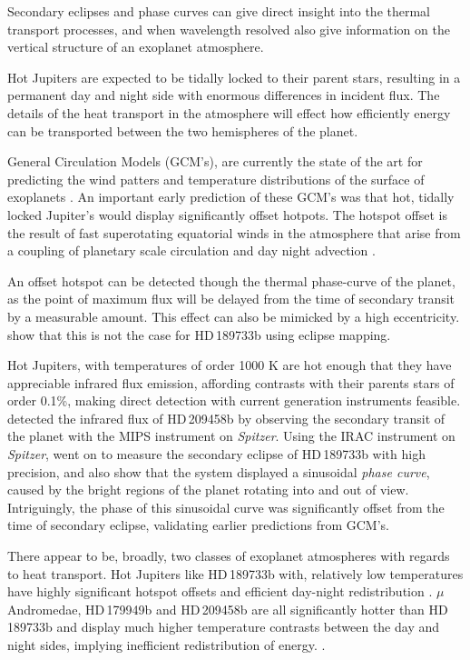 \documentclass[a4paper,fleqn,usenatbib]{mnras}
\begin{document}
Secondary eclipses and phase curves can give direct insight into the thermal transport processes, and when wavelength resolved also give information on the vertical structure of an exoplanet atmosphere.

Hot Jupiters are expected to be tidally locked to their parent stars, resulting in a permanent day and night side with enormous differences in incident flux. The details of the heat transport in the atmosphere will effect how efficiently energy can be transported between the two hemispheres of the planet.

General Circulation Models (GCM's), are currently the state of the art for predicting the wind patters and temperature distributions of the surface of exoplanets \citep[e.g.][]{Showman2008}. An important early prediction of these GCM's was that hot, tidally locked Jupiter's would display significantly offset hotpots. The hotspot offset is the result of fast superotating equatorial winds in the atmosphere that arise from a coupling of planetary scale circulation and day night advection \citep{Showman2011}.

An offset hotspot can be detected though the thermal phase-curve of the planet, as the point of maximum flux will be delayed from the time of secondary transit by a measurable amount. This effect can also be mimicked by a high eccentricity. \citet{J.deWit2012a} show that this is not the case for HD\,189733b using eclipse mapping.

Hot Jupiters, with temperatures of order 1000 K are hot enough that they have appreciable infrared flux emission, affording contrasts with their parents stars of order 0.1\%, making direct detection with current generation instruments feasible. \citet{Deming2005} detected the infrared flux of HD\,209458b by observing the secondary transit of the planet with the MIPS instrument on \emph{Spitzer}. Using the IRAC instrument on \emph{Spitzer}, \citet{Knutson2007b} went on to measure the secondary eclipse of HD\,189733b with high precision, and also show that the system displayed a sinusoidal \emph{phase curve}, caused by the bright regions of the planet rotating into and out of view. Intriguingly, the phase of this sinusoidal curve was significantly offset from the time of secondary eclipse, validating earlier predictions from GCM's.

There appear to be, broadly, two classes of exoplanet atmospheres with regards to heat transport. Hot Jupiters like HD\,189733b with, relatively low temperatures have highly significant hotspot offsets and efficient day-night redistribution \citep{Knutson2007b}. $\mu$ Andromedae, HD\,179949b and HD\,209458b are all significantly hotter than HD\,189733b and display much higher temperature contrasts between the day and night sides, implying inefficient redistribution of energy. \citep{Harrington2006,Cowan2007,zellem2014}. 
\end{document}
